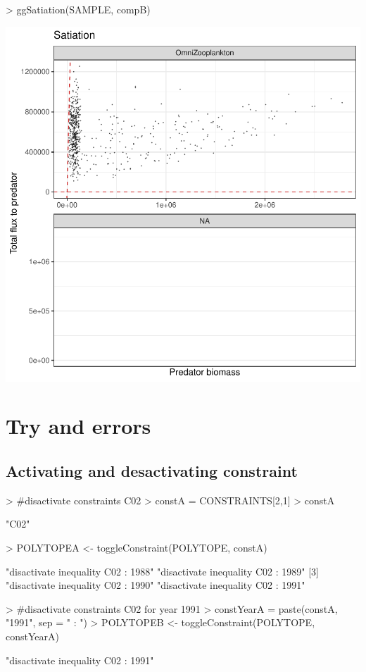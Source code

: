\documentclass{article}
\begin{document}
\begin{Schunk}
\begin{Sinput}
> ggSatiation(SAMPLE, compB)
\end{Sinput}
\end{Schunk}
\includegraphics{barents_SM-022}

\section{Try and errors}

\subsection{Activating and desactivating constraint}

\begin{Schunk}
\begin{Sinput}
> #disactivate constraints C02
> constA = CONSTRAINTS[2,1]
> constA
\end{Sinput}
\begin{Soutput}
[1] "C02"
\end{Soutput}
\begin{Sinput}
> POLYTOPEA <- toggleConstraint(POLYTOPE, constA)
\end{Sinput}
\begin{Soutput}
[1] "disactivate inequality C02 : 1988" "disactivate inequality C02 : 1989"
[3] "disactivate inequality C02 : 1990" "disactivate inequality C02 : 1991"
\end{Soutput}
\begin{Sinput}
> #disactivate constraints C02 for year 1991
> constYearA = paste(constA, "1991", sep = " : ")
> POLYTOPEB <- toggleConstraint(POLYTOPE, constYearA)
\end{Sinput}
\begin{Soutput}
[1] "disactivate inequality C02 : 1991"
\end{Soutput}
\end{Schunk}
\end{document}
